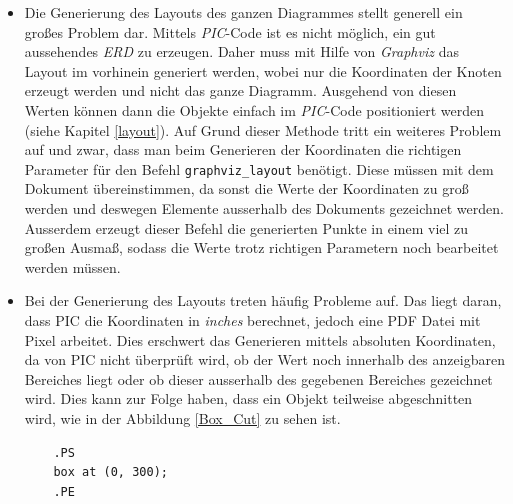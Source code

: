 \begin{itemize}
	\item 
	Die Generierung des Layouts des ganzen Diagrammes stellt generell ein großes Problem dar. Mittels \textit{PIC}-Code ist es nicht möglich, ein gut aussehendes \textit{ERD} zu erzeugen. Daher muss mit Hilfe von \textit{Graphviz} das Layout im vorhinein generiert werden, wobei nur die Koordinaten der Knoten erzeugt werden und nicht das ganze Diagramm. Ausgehend von diesen Werten können dann die Objekte einfach im \textit{PIC}-Code positioniert werden (siehe Kapitel \ref{layout}). 
	\pra
	\noindent
	Auf Grund dieser Methode tritt ein weiteres Problem auf und zwar, dass man beim Generieren der Koordinaten die richtigen Parameter für den Befehl \verb|graphviz_layout| benötigt. Diese müssen mit dem Dokument übereinstimmen, da sonst die Werte der Koordinaten zu groß werden und deswegen Elemente ausserhalb des Dokuments gezeichnet werden. Ausserdem erzeugt dieser Befehl die generierten Punkte in einem viel zu großen Ausmaß, sodass die Werte trotz richtigen Parametern noch bearbeitet werden müssen.
	\\
	
	\item Bei der Generierung des Layouts treten häufig Probleme auf. Das liegt daran, dass PIC die Koordinaten in \textit{inches} berechnet, jedoch eine PDF Datei mit Pixel arbeitet. Dies erschwert das Generieren mittels absoluten Koordinaten, da von PIC nicht überprüft wird, ob der Wert noch innerhalb des anzeigbaren Bereiches liegt oder ob dieser ausserhalb des gegebenen Bereiches gezeichnet wird. Dies kann zur Folge haben, dass ein Objekt teilweise abgeschnitten wird, wie in der Abbildung \ref{Box_Cut} zu sehen ist.
	\\
	
	\lstset{frame=lines}
	\lstset{basicstyle=\footnotesize}
	\begin{lstlisting}
	.PS
	box at (0, 300);
	.PE
	\end{lstlisting}
	

\end{itemize}
